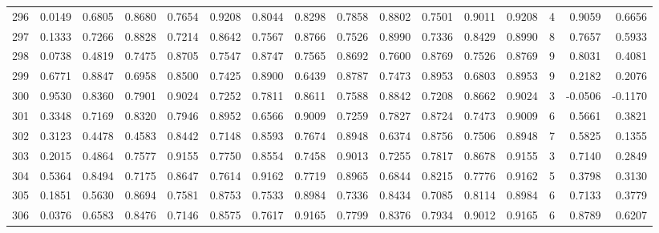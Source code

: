 \begin{tabular}{lrrrrrrrrrrrrrrr}
296 &      0.0149 &  0.6805 &  0.8680 &  0.7654 &  0.9208 &  0.8044 &  0.8298 &  0.7858 &  0.8802 &  0.7501 &   0.9011 &     0.9208 &      4 &                    0.9059 &                     0.6656 \\
297 &      0.1333 &  0.7266 &  0.8828 &  0.7214 &  0.8642 &  0.7567 &  0.8766 &  0.7526 &  0.8990 &  0.7336 &   0.8429 &     0.8990 &      8 &                    0.7657 &                     0.5933 \\
298 &      0.0738 &  0.4819 &  0.7475 &  0.8705 &  0.7547 &  0.8747 &  0.7565 &  0.8692 &  0.7600 &  0.8769 &   0.7526 &     0.8769 &      9 &                    0.8031 &                     0.4081 \\
299 &      0.6771 &  0.8847 &  0.6958 &  0.8500 &  0.7425 &  0.8900 &  0.6439 &  0.8787 &  0.7473 &  0.8953 &   0.6803 &     0.8953 &      9 &                    0.2182 &                     0.2076 \\
300 &      0.9530 &  0.8360 &  0.7901 &  0.9024 &  0.7252 &  0.7811 &  0.8611 &  0.7588 &  0.8842 &  0.7208 &   0.8662 &     0.9024 &      3 &                   -0.0506 &                    -0.1170 \\
301 &      0.3348 &  0.7169 &  0.8320 &  0.7946 &  0.8952 &  0.6566 &  0.9009 &  0.7259 &  0.7827 &  0.8724 &   0.7473 &     0.9009 &      6 &                    0.5661 &                     0.3821 \\
302 &      0.3123 &  0.4478 &  0.4583 &  0.8442 &  0.7148 &  0.8593 &  0.7674 &  0.8948 &  0.6374 &  0.8756 &   0.7506 &     0.8948 &      7 &                    0.5825 &                     0.1355 \\
303 &      0.2015 &  0.4864 &  0.7577 &  0.9155 &  0.7750 &  0.8554 &  0.7458 &  0.9013 &  0.7255 &  0.7817 &   0.8678 &     0.9155 &      3 &                    0.7140 &                     0.2849 \\
304 &      0.5364 &  0.8494 &  0.7175 &  0.8647 &  0.7614 &  0.9162 &  0.7719 &  0.8965 &  0.6844 &  0.8215 &   0.7776 &     0.9162 &      5 &                    0.3798 &                     0.3130 \\
305 &      0.1851 &  0.5630 &  0.8694 &  0.7581 &  0.8753 &  0.7533 &  0.8984 &  0.7336 &  0.8434 &  0.7085 &   0.8114 &     0.8984 &      6 &                    0.7133 &                     0.3779 \\
306 &      0.0376 &  0.6583 &  0.8476 &  0.7146 &  0.8575 &  0.7617 &  0.9165 &  0.7799 &  0.8376 &  0.7934 &   0.9012 &     0.9165 &      6 &                    0.8789 &                     0.6207 \\

\end{tabular}

